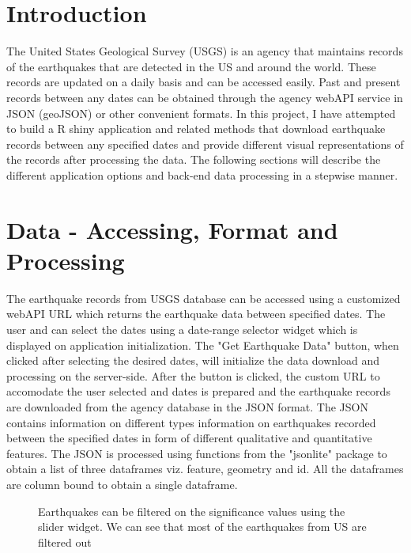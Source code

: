 \documentclass{article}
\begin{document}
	\section{Introduction}
		The United States Geological Survey (USGS) is an agency that maintains records of the earthquakes that are detected in the US and around the world. These records are updated on a daily basis and can be accessed easily. Past and present records between any dates can be obtained through the agency webAPI service in JSON (geoJSON) or other convenient formats. In this project, I have attempted to build a R shiny application and related methods that download earthquake records between any specified dates and provide different visual representations of the records after processing the data. The following sections will describe the different application options and back-end data processing in a stepwise manner.
	
	\section{Data - Accessing, Format and Processing}
		The earthquake records from USGS database can be accessed using a customized webAPI URL which returns the earthquake data between specified dates. The user and can select the dates using a date-range selector widget which is displayed on application initialization. The "Get Earthquake Data" button, when clicked after selecting the desired dates, will initialize the data download and processing on the server-side. After the button is clicked, the custom URL to accomodate the user selected and dates is prepared and the earthquake records are downloaded from the agency database in the JSON format. The JSON contains information on different types information on earthquakes recorded between the specified dates in form of different qualitative and quantitative features. The JSON is processed using functions from the "jsonlite" package to obtain a list of three dataframes viz. feature, geometry and id. All the dataframes are column bound to obtain a single dataframe.
		
		\begin{figure}
			\caption{Earthquakes can be filtered on the significance values using the slider widget. We can see that most of the earthquakes from US are filtered out}
		\end{figure}
		
\end{document}
